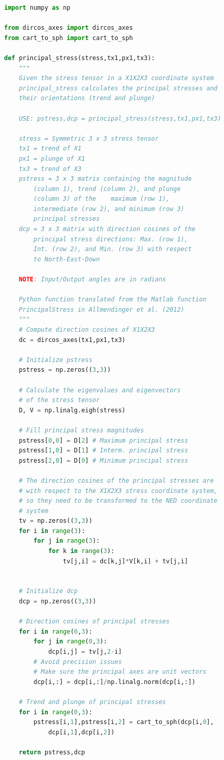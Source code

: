 \documentclass[a4paper , 12pt]{book}
\begin{document}
\begin{center}
\begin{lstlisting}[language=Python, frame=single]
import numpy as np

from dircos_axes import dircos_axes
from cart_to_sph import cart_to_sph

def principal_stress(stress,tx1,px1,tx3):
	"""
	Given the stress tensor in a X1X2X3 coordinate system
	principal_stress calculates the principal stresses and
	their orientations (trend and plunge) 
	
	USE: pstress,dcp = principal_stress(stress,tx1,px1,tx3)
	
	stress = Symmetric 3 x 3 stress tensor
	tx1 = trend of X1
	px1 = plunge of X1
	tx3 = trend of X3
	pstress = 3 x 3 matrix containing the magnitude
		(column 1), trend (column 2), and plunge
		(column 3) of the	 maximum (row 1),
		intermediate (row 2), and minimum (row 3)
		principal stresses
	dcp = 3 x 3 matrix with direction cosines of the
		principal stress directions: Max. (row 1),
		Int. (row 2), and Min. (row 3) with respect
		to North-East-Down
	
	NOTE: Input/Output angles are in radians
	
	Python function translated from the Matlab function
	PrincipalStress in Allmendinger et al. (2012)
	"""
	# Compute direction cosines of X1X2X3
	dc = dircos_axes(tx1,px1,tx3)
	
	# Initialize pstress
	pstress = np.zeros((3,3))
	
	# Calculate the eigenvalues and eigenvectors
	# of the stress tensor
	D, V = np.linalg.eigh(stress)
	
	# Fill principal stress magnitudes
	pstress[0,0] = D[2] # Maximum principal stress
	pstress[1,0] = D[1] # Interm. principal stress
	pstress[2,0] = D[0] # Minimum principal stress
	
	# The direction cosines of the principal stresses are
	# with respect to the X1X2X3 stress coordinate system,
	# so they need to be transformed to the NED coordinate
	# system
	tv = np.zeros((3,3))
	for i in range(3):
		for j in range(3):
			for k in range(3):
				tv[j,i] = dc[k,j]*V[k,i] + tv[j,i]
				
	
	# Initialize dcp
	dcp = np.zeros((3,3))
	
	# Direction cosines of principal stresses
	for i in range(0,3):
		for j in range(0,3):
			dcp[i,j] = tv[j,2-i]
		# Avoid precision issues
		# Make sure the principal axes are unit vectors
		dcp[i,:] = dcp[i,:]/np.linalg.norm(dcp[i,:])
	
	# Trend and plunge of principal stresses
	for i in range(0,3):
		pstress[i,1],pstress[i,2] = cart_to_sph(dcp[i,0],
			dcp[i,1],dcp[i,2])
	
	return pstress,dcp
\end{lstlisting}
\end{center}
\end{document}
